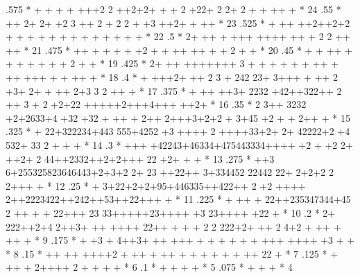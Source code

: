 \begin{Listing}
      .575  *              +     +  +  +  +++2 2 ++2+2+             +    +   2 +22+   2 2+ 2    + +    ++ +            *  24
      .55   *                   ++    2+ 2+ +2 3   ++               2  +    2 2 +   +3   ++2+ +        ++              *  23
      .525  *                      +  ++ ++2++2+2   +            +      + +  +  +    +  + + +  +   +        +          *  22
      .5    *                      2+ ++ + +++   ++++ ++        +                2 2  ++                       ++      *  21
      .475  *                    ++     + +   +     + +2  +         +       ++    ++ +    + 2 +             +          *  20
      .45   *                       +  +        ++ +                +    +         + +   + +    2   +        +         *  19
      .425  *                    2+ ++  +++++++ 3 +    + +     +    + +    ++     + ++ +++          + +  ++    +       *  18
      .4    *               +   +++2+ ++ 2 3 + 242 23+ 3+++ +  ++    2  +3+ 2+   +    ++ 2+3  3     2  ++ +            *  17
      .375  *                 + ++ ++3+   2232 +42++322++  2    ++   3 + 2  +2+22    +++++2+++4+++   ++2+              *  16
      .35   *                 2  3++ 3232 +2+2633+4 +32 +32   +  ++   +   2++  2+++3+2+2 + 3+45 +2 + + 2++   +         *  15
      .325  *                 +    22+322234+443 555+4252 +3 ++++ 2 ++++33+2+ 2+ 42222+2 +4 532+  33  2 +    +     +   *  14
      .3    *                 +++ +42243+46334+475443334++++ +2 +    +2 2+ ++2+ 2 44++2332++2+2+++  22   +2+  + +      *  13
      .275  *                   ++3  6+255325823646443+2+3+2   2+   23 ++22++ 3+334452 22442 22+ 2+2+2 2 2+++ +        *  12
      .25   *               +   3+22+2+2+95+446335++422++     2    +2 ++++ 2++2223422++242++53++22+++        +         *  11
      .225  *                +  ++ + 22++235347344+45  2 ++  +     + 22+++ 23 33+++++23++++ +3 23++++ +22  +           *  10
      .2    *                      2+ 222++2+4 2++3+ ++ ++++ 22++ + +  + 2 2 222+2+ ++ 2 4+2   + ++ +  ++ +            *   9
      .175  *                    +   +3 +   4++3+ ++  +++    +     +   +  +    +  +    +++   ++++   +3   + +           *   8
      .15   *                     ++    ++ ++++2    + ++  +          ++  + +     + +   + +    ++ 22  +                 *   7
      .125  *                  +   ++ +  2++++  2   +                           +   +         +                        *   6
      .1    *                                       +  +              +                  +                             *   5
      .075  *                               +  +      +                                                                *   4

\end{Listing}
